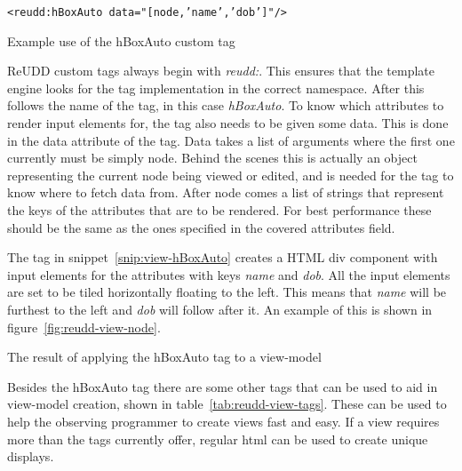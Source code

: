 \documentclass[a4paper]{report}
\begin{document}
\begin{snippet}[hbtp]
	\center
	\texttt{<reudd:hBoxAuto data="[node,'name','dob']"/>}
	\caption{Example use of the hBoxAuto custom tag}
	\label{snip:view-hBoxAuto}
\end{snippet}

ReUDD custom tags always begin with \emph{reudd:}. This ensures that the template engine looks for the tag implementation in the correct namespace. After this follows the name of the tag, in this case \emph{hBoxAuto}. To know which attributes to render input elements for, the tag also needs to be given some data. This is done in the data attribute of the tag. Data takes a list of arguments where the first one currently must be simply node. Behind the scenes this is actually an object representing the current node being viewed or edited, and is needed for the tag to know where to fetch data from. After node comes a list of strings that represent the keys of the attributes that are to be rendered. For best performance these should be the same as the ones specified in the covered attributes field.

The tag in snippet~\ref{snip:view-hBoxAuto} creates a HTML div component with input elements for the attributes with keys \emph{name} and \emph{dob}. All the input elements are set to be tiled horizontally floating to the left. This means that \emph{name} will be furthest to the left and \emph{dob} will follow after it. An example of this is shown in figure~\ref{fig:reudd-view-node}.

	{The result of applying the hBoxAuto tag to a view-model}

Besides the hBoxAuto tag there are some other tags that can be used to aid in view-model creation, shown in table~\ref{tab:reudd-view-tags}. These can be used to help the observing programmer to create views fast and easy. If a view requires more than the tags currently offer, regular html can be used to create unique displays.
\end{document}
